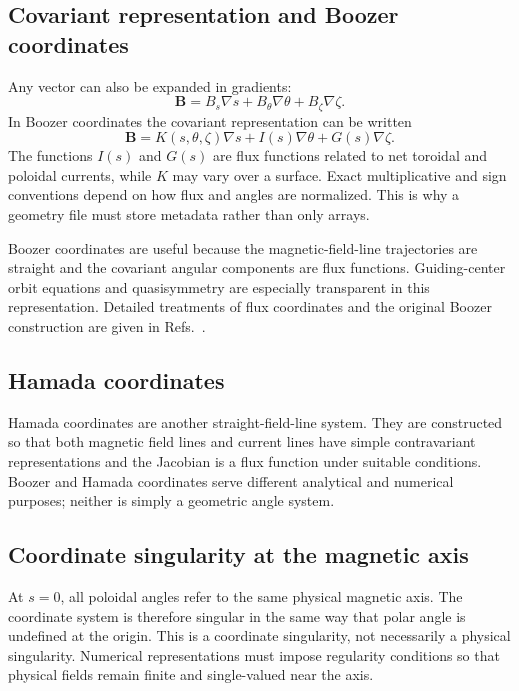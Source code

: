\subsection{Covariant representation and Boozer coordinates}
Any vector can also be expanded in gradients:
\begin{equation}
\mathbf B=B_s\nabla s+B_\theta\nabla\theta+B_\zeta\nabla\zeta.
\end{equation}
In Boozer coordinates the covariant representation can be written
\begin{equation}
\mathbf B
=K(s,\theta,\zeta)\nabla s
+I(s)\nabla\theta
+G(s)\nabla\zeta.
\label{eq:B_boozer_covariant}
\end{equation}
The functions $I(s)$ and $G(s)$ are flux functions related to net toroidal and poloidal currents, while $K$ may vary over a surface. Exact multiplicative and sign conventions depend on how flux and angles are normalized. This is why a geometry file must store metadata rather than only arrays.

Boozer coordinates are useful because the magnetic-field-line trajectories are straight and the covariant angular components are flux functions. Guiding-center orbit equations and quasisymmetry are especially transparent in this representation. Detailed treatments of flux coordinates and the original Boozer construction are given in Refs.~\cite{dHaeseleer1991,boozer1981}.

\subsection{Hamada coordinates}
Hamada coordinates are another straight-field-line system. They are constructed so that both magnetic field lines and current lines have simple contravariant representations and the Jacobian is a flux function under suitable conditions. Boozer and Hamada coordinates serve different analytical and numerical purposes; neither is simply a geometric angle system.

\subsection{Coordinate singularity at the magnetic axis}
At $s=0$, all poloidal angles refer to the same physical magnetic axis. The coordinate system is therefore singular in the same way that polar angle is undefined at the origin. This is a coordinate singularity, not necessarily a physical singularity. Numerical representations must impose regularity conditions so that physical fields remain finite and single-valued near the axis.

